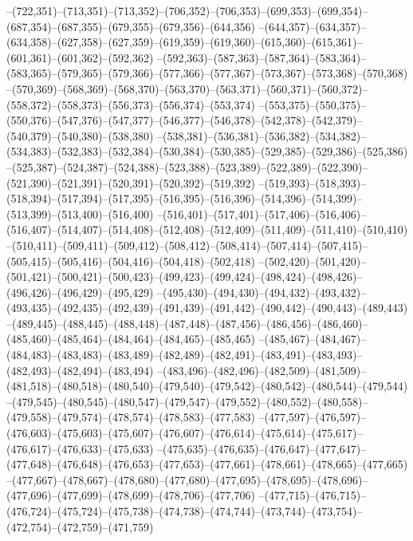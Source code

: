--(722,351)--(713,351)--(713,352)--(706,352)--(706,353)--(699,353)--(699,354)--(687,354)--(687,355)--(679,355)--(679,356)--(644,356)
--(644,357)--(634,357)--(634,358)--(627,358)--(627,359)--(619,359)--(619,360)--(615,360)--(615,361)--(601,361)--(601,362)--(592,362)
--(592,363)--(587,363)--(587,364)--(583,364)--(583,365)--(579,365)--(579,366)--(577,366)--(577,367)--(573,367)--(573,368)--(570,368)
--(570,369)--(568,369)--(568,370)--(563,370)--(563,371)--(560,371)--(560,372)--(558,372)--(558,373)--(556,373)--(556,374)--(553,374)
--(553,375)--(550,375)--(550,376)--(547,376)--(547,377)--(546,377)--(546,378)--(542,378)--(542,379)--(540,379)--(540,380)--(538,380)
--(538,381)--(536,381)--(536,382)--(534,382)--(534,383)--(532,383)--(532,384)--(530,384)--(530,385)--(529,385)--(529,386)--(525,386)
--(525,387)--(524,387)--(524,388)--(523,388)--(523,389)--(522,389)--(522,390)--(521,390)--(521,391)--(520,391)--(520,392)--(519,392)
--(519,393)--(518,393)--(518,394)--(517,394)--(517,395)--(516,395)--(516,396)--(514,396)--(514,399)--(513,399)--(513,400)--(516,400)
--(516,401)--(517,401)--(517,406)--(516,406)--(516,407)--(514,407)--(514,408)--(512,408)--(512,409)--(511,409)--(511,410)--(510,410)
--(510,411)--(509,411)--(509,412)--(508,412)--(508,414)--(507,414)--(507,415)--(505,415)--(505,416)--(504,416)--(504,418)--(502,418)
--(502,420)--(501,420)--(501,421)--(500,421)--(500,423)--(499,423)--(499,424)--(498,424)--(498,426)--(496,426)--(496,429)--(495,429)
--(495,430)--(494,430)--(494,432)--(493,432)--(493,435)--(492,435)--(492,439)--(491,439)--(491,442)--(490,442)--(490,443)--(489,443)
--(489,445)--(488,445)--(488,448)--(487,448)--(487,456)--(486,456)--(486,460)--(485,460)--(485,464)--(484,464)--(484,465)--(485,465)
--(485,467)--(484,467)--(484,483)--(483,483)--(483,489)--(482,489)--(482,491)--(483,491)--(483,493)--(482,493)--(482,494)--(483,494)
--(483,496)--(482,496)--(482,509)--(481,509)--(481,518)--(480,518)--(480,540)--(479,540)--(479,542)--(480,542)--(480,544)--(479,544)
--(479,545)--(480,545)--(480,547)--(479,547)--(479,552)--(480,552)--(480,558)--(479,558)--(479,574)--(478,574)--(478,583)--(477,583)
--(477,597)--(476,597)--(476,603)--(475,603)--(475,607)--(476,607)--(476,614)--(475,614)--(475,617)--(476,617)--(476,633)--(475,633)
--(475,635)--(476,635)--(476,647)--(477,647)--(477,648)--(476,648)--(476,653)--(477,653)--(477,661)--(478,661)--(478,665)--(477,665)
--(477,667)--(478,667)--(478,680)--(477,680)--(477,695)--(478,695)--(478,696)--(477,696)--(477,699)--(478,699)--(478,706)--(477,706)
--(477,715)--(476,715)--(476,724)--(475,724)--(475,738)--(474,738)--(474,744)--(473,744)--(473,754)--(472,754)--(472,759)--(471,759)
